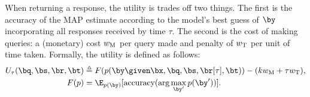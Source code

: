 When returning a response, the utility is trades off two things.
The first is the accuracy of the MAP estimate according to the model's best guess of $\by$ incorporating all responses received by time $\tau$.
The second is the cost of making queries: a (monetary) cost $w_\text{M}$ per query made and penalty of $w_\text{T}$ per unit of time taken.
Formally, the utility is defined as follows:
\begin{align}
  \label{eqn:utility}
  U_\tau(\bq, \bs, \br, \bt) &\eqdef F(p(\by \given \bx, \bq, \bs, \br[\tau], \bt)) - (k \weightmoney + \tau \weighttime), \\
  F(p) &= \E_{p(\by)}[\accuracy(\arg\max_{\by'} p(\by'))].
\end{align}

%
%







